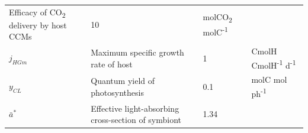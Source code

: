 \documentclass[]{elsarticle} %
\begin{document}
\begin{longtable}[c]{@{}llll@{}}
\begin{minipage}[t]{0.48\columnwidth}
Efficacy of CO\textsubscript{2} delivery by host CCMs
\strut\end{minipage} &
\begin{minipage}[t]{0.09\columnwidth}\raggedright\strut
10
\strut\end{minipage} &
\begin{minipage}[t]{0.23\columnwidth}\raggedright\strut
molCO\textsubscript{2} molC\textsuperscript{-1}
\strut\end{minipage}\tabularnewline
\begin{minipage}[t]{0.10\columnwidth}\raggedright\strut
\(j_{HGm}\)
\strut\end{minipage} &
\begin{minipage}[t]{0.48\columnwidth}\raggedright\strut
Maximum specific growth rate of host
\strut\end{minipage} &
\begin{minipage}[t]{0.09\columnwidth}\raggedright\strut
1
\strut\end{minipage} &
\begin{minipage}[t]{0.23\columnwidth}\raggedright\strut
CmolH CmolH\textsuperscript{-1} d\textsuperscript{-1}
\strut\end{minipage}\tabularnewline
\begin{minipage}[t]{0.10\columnwidth}\raggedright\strut
\(y_{CL}\)
\strut\end{minipage} &
\begin{minipage}[t]{0.48\columnwidth}\raggedright\strut
Quantum yield of photosynthesis
\strut\end{minipage} &
\begin{minipage}[t]{0.09\columnwidth}\raggedright\strut
0.1
\strut\end{minipage} &
\begin{minipage}[t]{0.23\columnwidth}\raggedright\strut
molC mol ph\textsuperscript{-1}
\strut\end{minipage}\tabularnewline
\begin{minipage}[t]{0.10\columnwidth}\raggedright\strut
\(\bar{a}^*\)
\strut\end{minipage} &
\begin{minipage}[t]{0.48\columnwidth}\raggedright\strut
Effective light-absorbing cross-section of symbiont
\strut\end{minipage} &
\begin{minipage}[t]{0.09\columnwidth}\raggedright\strut
1.34
\strut\end{minipage} &
\begin{minipage}[t]{0.23\columnwidth}\raggedright\strut

\end{minipage}
\end{longtable}
\end{document}
